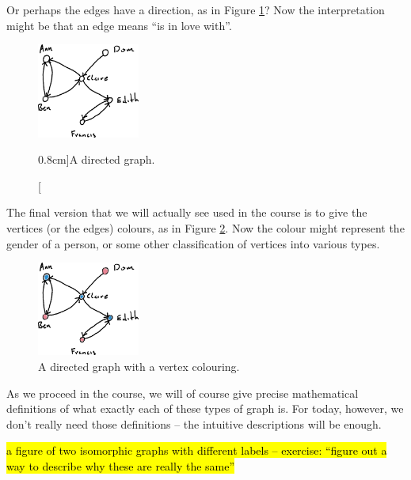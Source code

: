 \documentclass[nobib]{tufte-handout}
\begin{document}
Or perhaps the edges have a direction, as in Figure \ref{fig:labelled_digraph}? Now the interpretation might be that an edge means ``is in love with''.

\begin{figure}
  \centering
  \includegraphics[width=0.3\textwidth]{graphics/L1_exc/digraph.png}
  \caption[][0.8cm]{A directed graph.}
  \label{fig:labelled_digraph}
\end{figure}

The final version that we will actually see used in the course is to give the vertices (or the edges) colours, as in Figure \ref{fig:vertex_coloured_graph}. Now the colour might represent the gender of a person, or some other classification of vertices into various types.

\begin{figure}
  \centering
  \includegraphics[width=0.3\textwidth]{graphics/L1_exc/vertex_coloured_digraph.png}
  \caption{A directed graph with a vertex colouring.}
  \label{fig:vertex_coloured_graph}
\end{figure}

As we proceed in the course, we will of course give precise mathematical definitions of what exactly each of these types of graph is. For today, however, we don't really need those definitions -- the intuitive descriptions will be enough.

\begin{xca}
    \hl{a figure of two isomorphic graphs with different labels -- exercise: ``figure out a way to describe why these are really the same''}
\end{xca}

%
%
\end{document}
